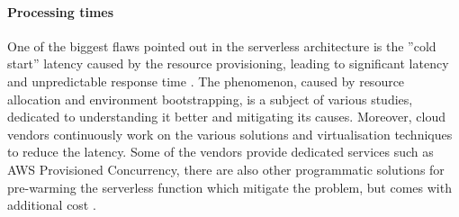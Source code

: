 



\paragraph{Processing times} \label{chapter:serverless-suitability-processing-time}
 
One of the biggest flaws pointed out in the serverless architecture is the ''cold start'' latency caused by the resource provisioning, leading to significant latency and unpredictable response time \cite{BerkeleyServerless}.
The phenomenon, caused by resource allocation and environment bootstrapping, is a subject of various studies, dedicated to understanding it better and mitigating its causes. Moreover, cloud vendors continuously work on the various solutions and virtualisation techniques to reduce the latency. Some of the vendors provide dedicated services such as AWS Provisioned Concurrency, there are also other programmatic solutions for pre-warming the serverless function which mitigate the problem, but comes with additional cost \cite{MartinFowlerServerless}.

